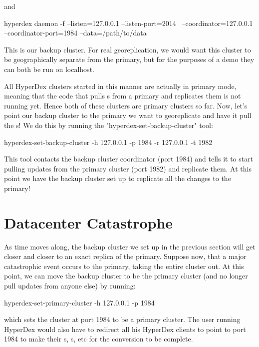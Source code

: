 and

\begin{consolecode}
hyperdex daemon -f --listen=127.0.0.1 --listen-port=2014 \
                   --coordinator=127.0.0.1 --coordinator-port=1984 --data=/path/to/data
\end{consolecode}

This is our backup cluster. For real georeplication, we would want this cluster
to be geographically separate from the primary, but for the purposes of a demo
they can both be run on localhost.

All HyperDex clusters started in this
manner are actually in primary mode, meaning that the code that pulls
\code{put}s from a primary and replicates them is not running yet. Hence
both of these clusters are primary clusters so far. Now, let's point our backup
cluster to the primary we want to georeplicate and have it pull the \code{put}s!
We do this by running the "hyperdex-set-backup-cluster" tool:

\begin{consolecode}
  hyperdex-set-backup-cluster -h 127.0.0.1 -p 1984 -r 127.0.0.1 -t 1982
\end{consolecode}

This tool contacts the backup cluster coordinator (port 1984) and tells
it to start pulling updates from the primary cluster (port 1982) and
replicate them. At this point we have the backup cluster set up to
replicate all the changes to the primary!

\section{Datacenter Catastrophe}
\label{sec:catastrophe}

As time moves along, the backup cluster we set up in the previous
section will get closer and closer to an exact replica of the primary.
Suppose now, that a major catastrophic event occurs to the primary,
taking the entire cluster out. At this point, we can move the backup cluster
to be the primary cluster (and no longer pull updates from anyone else) by
running:

\begin{consolecode}
  hyperdex-set-primary-cluster -h 127.0.0.1 -p 1984
\end{consolecode}

which sets the cluster at port 1984 to be a primary cluster. The user
running HyperDex would also have to redirect all his HyperDex clients to point
to port 1984 to make their \code{get}s, \code{put}s, etc for the conversion
to be complete.

